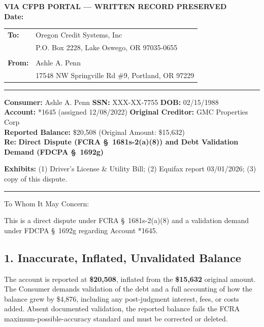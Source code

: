 \documentclass[12pt,letterpaper]{article}
\begin{document}
\begin{center}\textbf{VIA CFPB PORTAL --- WRITTEN RECORD PRESERVED}\\ \textbf{Date:} \underline{\hspace{3cm}}\end{center}

\begin{tabular}{@{}ll}
  \textbf{To:} & Oregon Credit Systems, Inc \\ & P.O. Box 2228, Lake Oswego, OR 97035-0655 \\ & \\
  \textbf{From:} & Ashle A. Penn \\ & 17548 NW Springville Rd \#9, Portland, OR 97229 \\
\end{tabular}

\vspace{1em}\hrule\vspace{1em}
\textbf{Consumer:} Ashle A. Penn \quad \textbf{SSN:} XXX-XX-7755 \quad \textbf{DOB:} 02/15/1988 \\
\textbf{Account:} *1645 (assigned 12/08/2022) \quad \textbf{Original Creditor:} GMC Properties Corp \\
\textbf{Reported Balance:} \$20,508 (Original Amount: \$15,632) \\
\textbf{Re:} \textbf{Direct Dispute (FCRA \S~1681s-2(a)(8)) and Debt Validation Demand (FDCPA \S~1692g)}

\vspace{1em}\textbf{Exhibits:} (1) Driver's License \& Utility Bill; (2) Equifax report 03/01/2026; (3) copy of this dispute.
\vspace{1em}\hrule\vspace{1em}

To Whom It May Concern:

This is a direct dispute under FCRA \S~1681s-2(a)(8) and a validation demand under FDCPA \S~1692g regarding Account *1645.

\subsection*{1. Inaccurate, Inflated, Unvalidated Balance}
The account is reported at \textbf{\$20,508}, inflated from the \textbf{\$15,632} original amount. The Consumer demands validation of the debt and a full accounting of how the balance grew by \$4,876, including any post-judgment interest, fees, or costs added. Absent documented validation, the reported balance fails the FCRA maximum-possible-accuracy standard and must be corrected or deleted.
\end{document}
